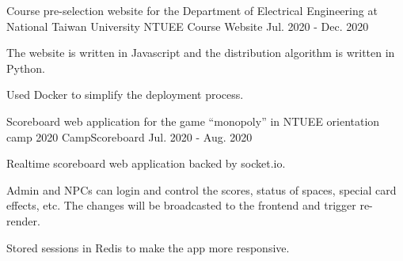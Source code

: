 \begin{cventries}
  \cventry
  {Course pre-selection website for the Department of Electrical Engineering at National Taiwan University}
  {NTUEE Course Website \href{https://github.com/NTUEEInfoDep/NTUEECourseWebsite2020}{\color{red}{[Github Link]}}}
  {}
  {Jul. 2020 - Dec. 2020} %
  {
    \begin{cvitems} %
      \item {The website is written in Javascript and the distribution algorithm is written in Python.}
      \item {Used Docker to simplify the deployment process.}
    \end{cvitems}
  }

  \cventry
  {Scoreboard web application for the game “monopoly” in NTUEE orientation camp 2020}
  {CampScoreboard \href{https://github.com/MortalHappiness/CampScoreboard}{\color{red}{[Github Link]}}}
  {}
  {Jul. 2020 - Aug. 2020} %
  {
    \begin{cvitems} %
      \item {Realtime scoreboard web application backed by socket.io.}
      \item {Admin and NPCs can login and control the scores, status of spaces, special card effects, etc. The changes will be broadcasted to the frontend and trigger re-render.}
      \item {Stored sessions in Redis to make the app more responsive.}
    \end{cvitems}
  }


\end{cventries}
